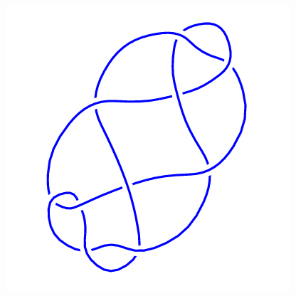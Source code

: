 \begin{figure}[H]
\begin{minipage}[b]{.18\linewidth}
	\end{minipage}
	\begin{minipage}[b]{.18\linewidth}
		\centering
		\includegraphics[width=\linewidth]{../data/10_41.png}
	\end{minipage}
\end{figure}
